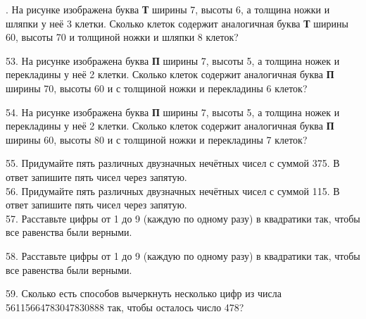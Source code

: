 \newpage
{}. На рисунке изображена буква {\bf Т} ширины 7, высоты 6, а толщина ножки и шляпки у неё 3 клетки. Сколько клеток содержит аналогичная буква {\bf Т} ширины 60, высоты 70 и толщиной ножки и шляпки 8 клеток?
\begin{center}
\begin{figure}[ht!]
\end{figure}
\end{center}
53. На рисунке изображена буква {\bf П} ширины 7, высоты 5, а толщина ножек и перекладины у неё 2 клетки. Сколько клеток содержит аналогичная буква {\bf П} ширины 70, высоты 60 и с толщиной ножки и перекладины 6 клеток?
\begin{center}
\begin{figure}[ht!]
\end{figure}
\end{center}
54. На рисунке изображена буква {\bf П} ширины 7, высоты 5, а толщина ножек и перекладины у неё 2 клетки. Сколько клеток содержит аналогичная буква {\bf П} ширины 60, высоты 80 и с толщиной ножки и перекладины 7 клеток?
\begin{center}
\begin{figure}[ht!]
\end{figure}
\end{center}
55. Придумайте пять различных двузначных нечётных чисел с суммой 375. В ответ запишите пять чисел через запятую.\\
56. Придумайте пять различных двузначных нечётных чисел с суммой 115. В ответ запишите пять чисел через запятую.\\
57. Расставьте цифры от 1 до 9 (каждую по одному разу) в квадратики так, чтобы все равенства были верными.
\begin{center}
\begin{figure}[ht!]
\end{figure}
\end{center}
58. Расставьте цифры от 1 до 9 (каждую по одному разу) в квадратики так, чтобы все равенства были верными.
\begin{center}
\begin{figure}[ht!]
\end{figure}
\end{center}
59. Сколько есть способов вычеркнуть несколько цифр из числа 56115664783047830888 так, чтобы осталось число 478?\\

